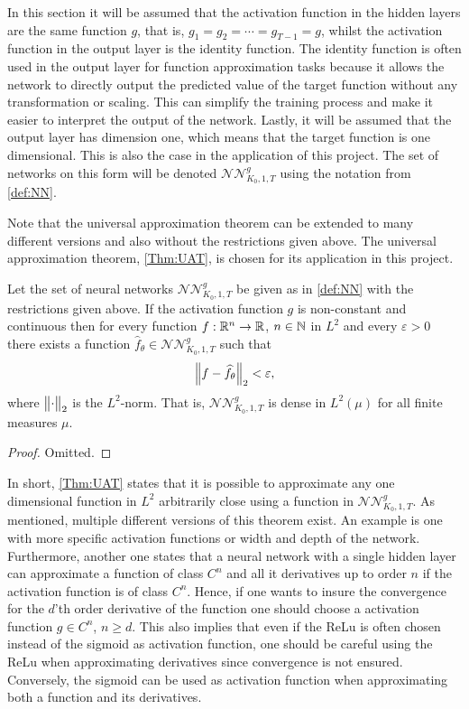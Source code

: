 In this section it will be assumed that the activation function in the hidden layers are the same function $g$, that is, $g_1 = g_2 = \cdots = g_{T-1} = g$, whilst the activation function in the output layer is the identity function. The identity function is often used in the output layer for function approximation tasks because it allows the network to directly output the predicted value of the target function without any transformation or scaling. This can simplify the training process and make it easier to interpret the output of the network. Lastly, it will be assumed that the output layer has dimension one, which means that the target function is one dimensional. This is also the case in the application of this project. The set of networks on this form will be denoted $\mathcal{NN}^g_{K_0, 1, T}$ using the notation from \autoref{def:NN}. 

Note that the universal approximation theorem can be extended to many different versions and also without the restrictions given above. The universal approximation theorem, \autoref{Thm:UAT}, is chosen for its application in this project. 
\begin{thm} \label{Thm:UAT}
    Let the set of neural networks $\mathcal{NN}^g_{K_0, 1, T}$ be given as in \autoref{def:NN} with the restrictions given above. If the activation function $g$ is non-constant and continuous then for every function $f:\mathbb{R}^n \to \mathbb{R}$, $n\in \mathbb{N}$ in $L^2$ and every $\varepsilon > 0$ there exists a function $\hat{f}_{\theta} \in \mathcal{NN}^g_{K_0, 1, T}$ such that
    \begin{align*}
        \norm{f - \hat{f}_{\theta}}_2 < \varepsilon, 
    \end{align*}
    where $\norm{\cdot}_2$ is the $L^2$-norm. That is, $\mathcal{NN}^g_{K_0, 1, T}$ is dense in $L^2(\mu)$ for all finite measures $\mu$.
\end{thm}
\begin{proof}
    Omitted.
\end{proof}

In short, \autoref{Thm:UAT} states that it is possible to approximate any one dimensional function in $L^2$ arbitrarily close using a function in $\mathcal{NN}^g_{K_0, 1, T}$. As mentioned, multiple different versions of this theorem exist. An example is one with more specific activation functions or width and depth of the network. Furthermore, another one states that a neural network with a single hidden layer can approximate a function of class $C^n$ and all it derivatives up to order $n$ if the activation function is of class $C^n$. Hence, if one wants to insure the convergence for the $d$'th order derivative of the function one should choose a activation function $g \in C^n$, $n \geq d$. This also implies that even if the ReLu is often chosen instead of the sigmoid as activation function, one should be careful using the ReLu when approximating derivatives since convergence is not ensured. Conversely, the sigmoid can be used as activation function when approximating both a function and its derivatives.

